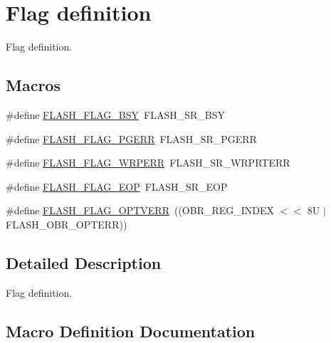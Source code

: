 \hypertarget{group___f_l_a_s_h___flag__definition}{}\section{Flag definition}
\label{group___f_l_a_s_h___flag__definition}


Flag definition.  


\subsection*{Macros}
\begin{DoxyCompactItemize}
\item 
\#define \hyperlink{group___f_l_a_s_h___flag__definition_gad3bc368f954ad7744deda3315da2fff7}{F\+L\+A\+S\+H\+\_\+\+F\+L\+A\+G\+\_\+\+B\+SY}~F\+L\+A\+S\+H\+\_\+\+S\+R\+\_\+\+B\+SY
\item 
\#define \hyperlink{group___f_l_a_s_h___flag__definition_gae2ef62dee0a5ca01e6226746039b6f20}{F\+L\+A\+S\+H\+\_\+\+F\+L\+A\+G\+\_\+\+P\+G\+E\+RR}~F\+L\+A\+S\+H\+\_\+\+S\+R\+\_\+\+P\+G\+E\+RR
\item 
\#define \hyperlink{group___f_l_a_s_h___flag__definition_ga6abf64f916992585899369166db3f266}{F\+L\+A\+S\+H\+\_\+\+F\+L\+A\+G\+\_\+\+W\+R\+P\+E\+RR}~F\+L\+A\+S\+H\+\_\+\+S\+R\+\_\+\+W\+R\+P\+R\+T\+E\+RR
\item 
\#define \hyperlink{group___f_l_a_s_h___flag__definition_gaf043ba4d8f837350bfc7754a99fae5a9}{F\+L\+A\+S\+H\+\_\+\+F\+L\+A\+G\+\_\+\+E\+OP}~F\+L\+A\+S\+H\+\_\+\+S\+R\+\_\+\+E\+OP
\item 
\#define \hyperlink{group___f_l_a_s_h___flag__definition_gacb2c4c991a260c3f110cd8c72f302864}{F\+L\+A\+S\+H\+\_\+\+F\+L\+A\+G\+\_\+\+O\+P\+T\+V\+E\+RR}~((O\+B\+R\+\_\+\+R\+E\+G\+\_\+\+I\+N\+D\+EX $<$$<$ 8\+U $\vert$ F\+L\+A\+S\+H\+\_\+\+O\+B\+R\+\_\+\+O\+P\+T\+E\+R\+R))
\end{DoxyCompactItemize}


\subsection{Detailed Description}
Flag definition. 



\subsection{Macro Definition Documentation}
\mbox{\label{group___f_l_a_s_h___flag__definition_gad3bc368f954ad7744deda3315da2fff7}} 
